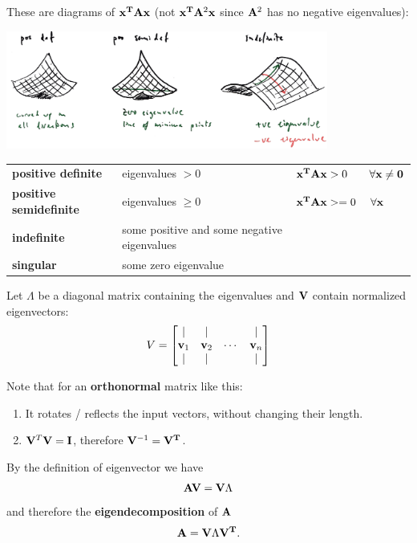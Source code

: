 \documentclass[12pt]{article}
\begin{document}
\begin{minipage}{\textwidth}
These are diagrams of $\mathbf x^{\mathbf{T}}\mathbf A\mathbf x$ (not $\mathbf x^{\mathbf{T}}\mathbf A^2\mathbf x$ since $\mathbf A^2$ has no negative eigenvalues):

\includegraphics[width=300pt]{img/machine-learning-quadratic-form-eigenvectors-2.png}

\begin{tabular}{ l | l | l }
  \textbf{positive definite}     & eigenvalues $> 0$    & $\mathbf x^{\mathbf{T}}\mathbf A\mathbf x > 0 ~~~~~~ \forall \mathbf x \neq \mathbf 0$ \\
  \textbf{positive semidefinite} & eigenvalues $\geq 0$ & $\mathbf x^{\mathbf{T}}\mathbf A\mathbf x >= 0 ~~~~ \forall \mathbf x$ \\
  \textbf{indefinite}            & some positive and some negative eigenvalues & \\
  \textbf{singular}              & some zero eigenvalue \\
\end{tabular}
\end{minipage}

Let $\Lambda$ be a diagonal matrix containing the eigenvalues and $\mathbf V$ contain
normalized eigenvectors:
\begin{align*}
V = \begin{bmatrix}
\mid & \mid & & \mid \\
\mathbf v_1 & \mathbf v_2 & \cdots & \mathbf v_n\\
\mid & \mid & & \mid \\
\end{bmatrix}
\end{align*}

Note that for an \textbf{orthonormal} matrix like this:
\begin{enumerate}
\item It rotates / reflects the input vectors, without changing their length.
\item  $\mathbf V^T\mathbf V = \mathbf I$, therefore $\mathbf V^{-1} = \mathbf V^{\mathbf{T}}$.
\end{enumerate}


By the definition of eigenvector we have
\begin{align*}
  \mathbf A\mathbf V = \mathbf V\Lambda
\end{align*}
and therefore the \textbf{eigendecomposition} of $\mathbf A$
\begin{align*}
  \mathbf A = \mathbf V\Lambda\mathbf V^{\mathbf{T}}.
\end{align*}
\end{document}
